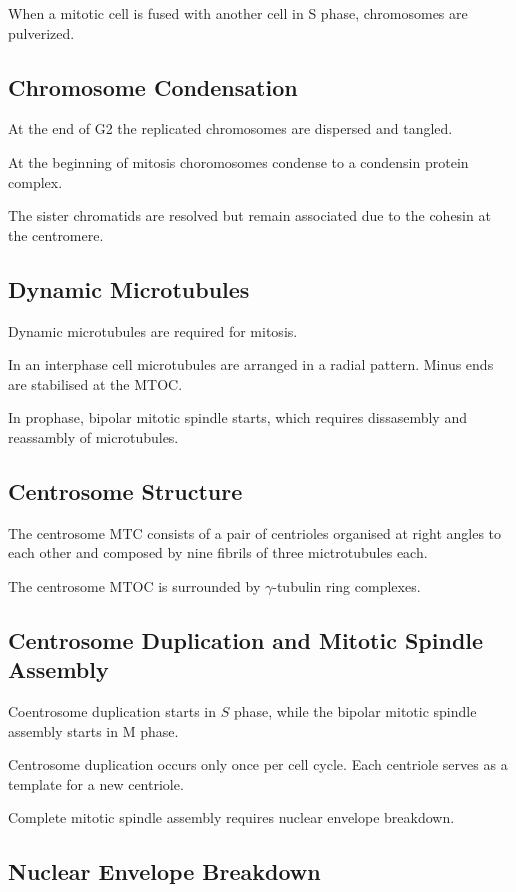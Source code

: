 \documentclass[11pt]{scrartcl}
\begin{document}
When a mitotic cell is fused with another cell in S phase, chromosomes
are pulverized.

\subsection{Chromosome Condensation}

At the end of G2 the replicated chromosomes are dispersed and tangled.

At the beginning of mitosis choromosomes condense to a condensin protein complex.

The sister chromatids are resolved but remain associated due to the
cohesin at the centromere.

\subsection{Dynamic Microtubules}

Dynamic microtubules are required for mitosis.

In an interphase cell microtubules are arranged in a radial pattern. Minus ends are stabilised at the MTOC. 

In prophase, bipolar mitotic spindle starts, which requires
dissasembly and reassambly of microtubules.

\subsection{Centrosome Structure}

The centrosome MTC consists of a pair of centrioles organised at right
angles to each other and composed by nine fibrils of three mictrotubules each.

The centrosome MTOC is surrounded by $\gamma$-tubulin ring complexes.

\subsection{Centrosome Duplication and Mitotic Spindle Assembly}

Coentrosome duplication starts in $S$ phase, while the bipolar mitotic
spindle assembly starts in M phase.

Centrosome duplication occurs only once per cell cycle. Each centriole
serves as a template for a new centriole.

Complete mitotic spindle assembly requires nuclear envelope breakdown.

\subsection{Nuclear Envelope Breakdown}
\end{document}
